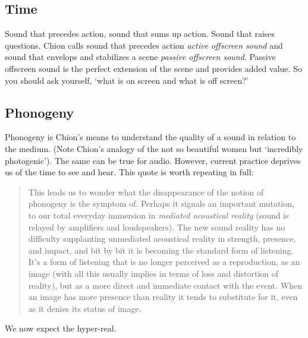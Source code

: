 \subsection{Time}
Sound that precedes action, sound that sums up action. Sound that raises questions.
Chion calls sound that precedes action \textit{active offscreen sound} and sound that envelops and stabilizes a scene \textit{passive offscreen sound}. Passive offscreen sound is the perfect extension of the scene and provides added value.
So you should ask yourself, `what is on screen and what is off screen?'

\subsection{Phonogeny}
Phonogeny is Chion's means to understand the quality of a sound \citep[101]{chion1990} in relation to the medium. (Note Chion's analogy of the not so beautiful women but `incredibly photogenic'). The same can be true for audio. However, current practice deprives us of the time to see and hear. This quote is worth repeating in full:

\begin{quotation}
This leads us to wonder what the disappearance of the notion of phonogeny is the symptom of. Perhaps it signals an important mutation, to our total everyday immersion in \textit{mediated acoustical reality} (sound is relayed by amplifiers and loudspeakers). The new sound reality has no difficulty supplanting unmediated acoustical reality in strength, presence, and impact, and bit by bit it is becoming the standard form of listening. It's a form of listening that is no longer perceived as a reproduction, as an image (with all this usually implies in terms of loss and distortion of reality), but as a more direct and immediate contact with the event. When an image has more presence than reality it tends to substitute for it, even as it denies its status of image.

\end{quotation}

We now expect the hyper-real. 


